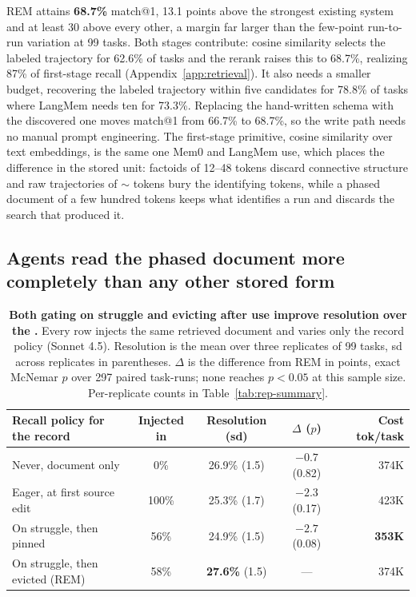 \documentclass{article}
\newcommand{\sysname}{REM}
\begin{document}
\sysname{} attains \textbf{68.7\%} match@1, 13.1 points above the strongest existing system and at least 30 above every other, a margin far larger than the few-point run-to-run variation at 99 tasks. Both stages contribute: cosine similarity selects the labeled trajectory for 62.6\% of tasks and the rerank raises this to 68.7\%, realizing 87\% of first-stage recall (Appendix~\ref{app:retrieval}). It also needs a smaller budget, recovering the labeled trajectory within five candidates for 78.8\% of tasks where LangMem needs ten for 73.3\%. Replacing the hand-written schema with the discovered one moves match@1 from 66.7\% to 68.7\%, so the write path needs no manual prompt engineering. The first-stage primitive, cosine similarity over text embeddings, is the same one Mem0 and LangMem use, which places the difference in the stored unit: factoids of 12--48 tokens discard connective structure and raw trajectories of $\sim$ tokens bury the identifying tokens, while a phased document of a few hundred tokens keeps what identifies a run and discards the search that produced it.

\subsection{Agents read the phased document more completely than any other stored form}
\label{sec:results-utilization}

\begin{table}[t]
\begin{center}
\small
\begin{tabular}{@{}lcccr@{}}
\toprule
\textbf{Recall policy for the record} & \textbf{Injected in} & \textbf{Resolution (sd)} & $\Delta$ ($p$) & \textbf{Cost tok/task} \\
\midrule
Never, document only & 0\% & 26.9\% (1.5) & $-0.7$ (0.82) & 374K \\
Eager, at first source edit & 100\% & 25.3\% (1.7) & $-2.3$ (0.17) & 423K \\
On struggle, then pinned & 56\% & 24.9\% (1.5) & $-2.7$ (0.08) & \textbf{353K} \\
\midrule
On struggle, then evicted (\sysname{}) & 58\% & \textbf{27.6\%} (1.5) & --- & 374K \\
\bottomrule
\end{tabular}
\end{center}
\caption{\textbf{Both gating on struggle and evicting after use improve resolution over the .} Every row injects the same retrieved document and varies only the record policy (Sonnet 4.5). Resolution is the mean over three replicates of 99 tasks, sd across replicates in parentheses. $\Delta$ is the difference from \sysname{} in points, exact McNemar $p$ over 297 paired task-runs; none reaches $p<0.05$ at this sample size. Per-replicate counts in Table~\ref{tab:rep-summary}.}
\label{tab:ablation}
\end{table}
\end{document}
